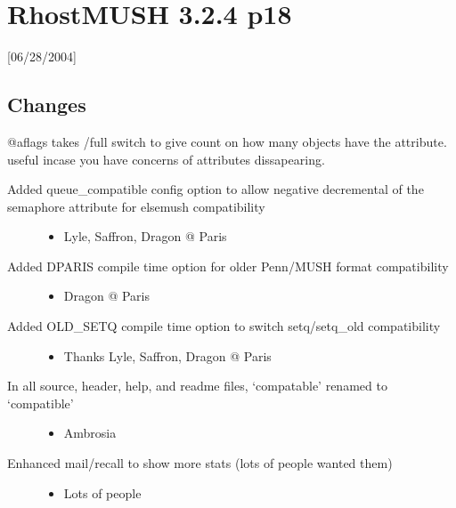\documentclass[letterpaper,10pt,english]{sphinxmanual}
\begin{document}
\section{RhostMUSH 3.2.4 p18}
\label{\detokenize{changelog:rhostmush-3-2-4-p18}}\label{\detokenize{changelog:changelog-3-2-4p18}}
\sphinxAtStartPar
{[}06/28/2004{]}


\subsection{Changes}
\label{\detokenize{changelog:id2}}
\sphinxAtStartPar
@aflags takes /full switch to give count on how many objects have the attribute.  useful incase you have concerns of attributes dissapearing.
\begin{description}
\item[{Added queue\_compatible config option to allow negative decremental of the semaphore attribute for elsemush compatibility}] \leavevmode\begin{itemize}
\item {} 
\sphinxAtStartPar
Lyle, Saffron, Dragon @ Paris

\end{itemize}

\item[{Added \sphinxhyphen{}DPARIS compile time option for older Penn/MUSH format compatibility}] \leavevmode\begin{itemize}
\item {} 
\sphinxAtStartPar
Dragon @ Paris

\end{itemize}

\item[{Added \sphinxhyphen{}OLD\_SETQ compile time option to switch setq/setq\_old compatibility}] \leavevmode\begin{itemize}
\item {} 
\sphinxAtStartPar
Thanks Lyle, Saffron, Dragon @ Paris

\end{itemize}

\item[{In all source, header, help, and readme files, ‘compatable’ renamed to ‘compatible’}] \leavevmode\begin{itemize}
\item {} 
\sphinxAtStartPar
Ambrosia

\end{itemize}

\item[{Enhanced mail/recall to show more stats (lots of people wanted them)}] \leavevmode\begin{itemize}
\item {} 
\sphinxAtStartPar
Lots of people

\end{itemize}

\end{description}
\end{document}

